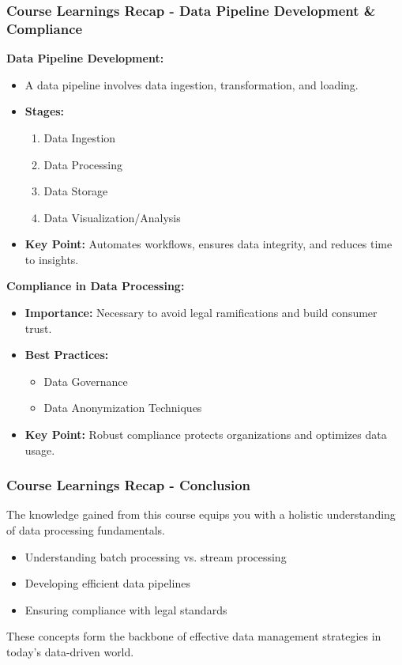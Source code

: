 \documentclass{beamer}
\begin{document}
\begin{frame}[fragile]
    \frametitle{Course Learnings Recap - Data Pipeline Development \& Compliance}
    \textbf{Data Pipeline Development:}
    \begin{itemize}
        \item A data pipeline involves data ingestion, transformation, and loading.
        \item \textbf{Stages:}
            \begin{enumerate}
                \item Data Ingestion
                \item Data Processing
                \item Data Storage
                \item Data Visualization/Analysis
            \end{enumerate}
        \item \textbf{Key Point:} Automates workflows, ensures data integrity, and reduces time to insights.
    \end{itemize}

    \textbf{Compliance in Data Processing:}
    \begin{itemize}
        \item \textbf{Importance:} Necessary to avoid legal ramifications and build consumer trust.
        \item \textbf{Best Practices:}
            \begin{itemize}
                \item Data Governance
                \item Data Anonymization Techniques
            \end{itemize}
        \item \textbf{Key Point:} Robust compliance protects organizations and optimizes data usage.
    \end{itemize}
\end{frame}

\begin{frame}[fragile]
    \frametitle{Course Learnings Recap - Conclusion}
    The knowledge gained from this course equips you with a holistic understanding of data processing fundamentals. 
    \begin{itemize}
        \item Understanding batch processing vs. stream processing
        \item Developing efficient data pipelines
        \item Ensuring compliance with legal standards
    \end{itemize}
    These concepts form the backbone of effective data management strategies in today's data-driven world.
\end{frame}
\end{document}
